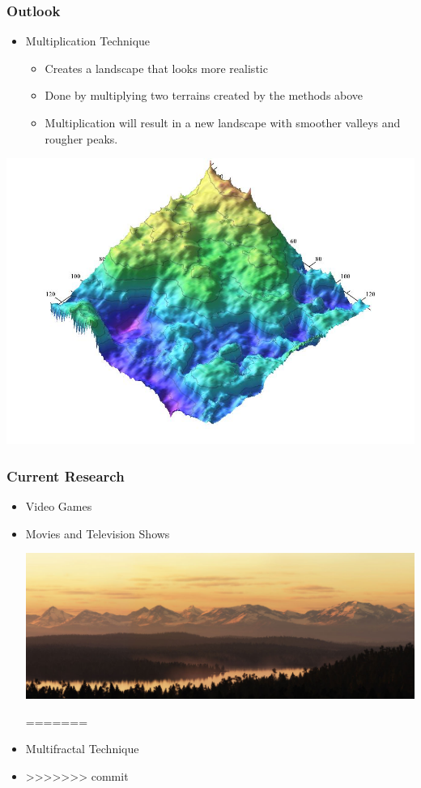 \documentclass{beamer}
\begin{document}
  \begin{frame}
  \frametitle{Outlook}
  \begin{itemize}
    \item Multiplication Technique
    \begin{itemize}
    \item Creates a landscape that looks more realistic 
    \item Done by multiplying two terrains created by the methods above
    \item Multiplication will result in a new landscape with smoother valleys and rougher peaks.
    \end{itemize}
    \end{itemize}
    \begin{center}
    \includegraphics[scale=0.2]{multipliedterrain.jpg}
    \end{center}
\end{frame}

\begin{frame}
 \frametitle{Current Research}
\begin{itemize}
<<<<<<< HEAD
\item Video Games
\item Movies and Television Shows
\\
\begin{center}
\includegraphics[scale = 0.2]{applicationslidepic.jpg}
\end{center}
=======
 \item Multifractal Technique
\item 
>>>>>>> commit
\end{itemize}
\end{frame}
\end{document}
